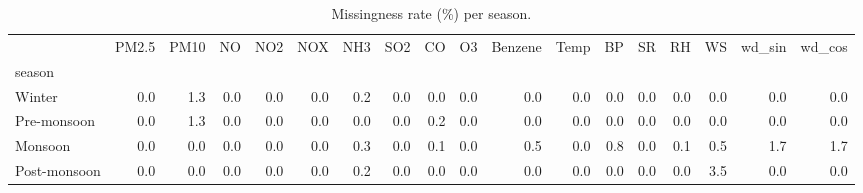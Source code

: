 \begin{table}
\caption{Missingness rate (\%) per season.}
\label{tab:missingness_season}
\begin{tabular}{lrrrrrrrrrrrrrrrrr}
\toprule
 & PM2.5 & PM10 & NO & NO2 & NOX & NH3 & SO2 & CO & O3 & Benzene & Temp & BP & SR & RH & WS & wd\_sin & wd\_cos \\
season &  &  &  &  &  &  &  &  &  &  &  &  &  &  &  &  &  \\
\midrule
Winter & 0.0 & 1.3 & 0.0 & 0.0 & 0.0 & 0.2 & 0.0 & 0.0 & 0.0 & 0.0 & 0.0 & 0.0 & 0.0 & 0.0 & 0.0 & 0.0 & 0.0 \\
Pre-monsoon & 0.0 & 1.3 & 0.0 & 0.0 & 0.0 & 0.0 & 0.0 & 0.2 & 0.0 & 0.0 & 0.0 & 0.0 & 0.0 & 0.0 & 0.0 & 0.0 & 0.0 \\
Monsoon & 0.0 & 0.0 & 0.0 & 0.0 & 0.0 & 0.3 & 0.0 & 0.1 & 0.0 & 0.5 & 0.0 & 0.8 & 0.0 & 0.1 & 0.5 & 1.7 & 1.7 \\
Post-monsoon & 0.0 & 0.0 & 0.0 & 0.0 & 0.0 & 0.2 & 0.0 & 0.0 & 0.0 & 0.0 & 0.0 & 0.0 & 0.0 & 0.0 & 3.5 & 0.0 & 0.0 \\
\bottomrule
\end{tabular}
\end{table}

